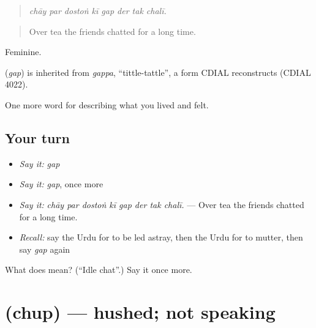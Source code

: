 \begin{quote}
       
\end{quote}

\begin{quote}
\emph{chāy par dostoṅ kī gap der tak chalī.}
\end{quote}

\begin{quote}
Over tea the friends chatted for a long time.
\end{quote}

Feminine.

\begin{cousinweb}
\textbf{} (\emph{gap}) is inherited from \emph{gappa}, \textquotedblleft{}tittle-tattle\textquotedblright{}, a form CDIAL reconstructs (CDIAL 4022).
\end{cousinweb}

\begin{grammarlens}[title={What you've built}]
One more word for describing what you lived and felt.
\end{grammarlens}

\subsection*{Your turn}
\begin{itemize}
\raggedright
  \item \emph{Say it:} \emph{gap}
  \item \emph{Say it:} \emph{gap}, once more
  \item \emph{Say it:} \emph{chāy par dostoṅ kī gap der tak chalī.} — Over tea the friends chatted for a long time.
  \item \emph{Recall:} say the Urdu for to be led astray, then the Urdu for to mutter, then say \emph{gap} again
\end{itemize}

\begin{tcolorbox}[breakable,colback=teal!4,colframe=teal!35!black,title={Before you move on}]
What does  mean? (\textquotedblleft{}Idle chat\textquotedblright{}.) Say it once more.
\end{tcolorbox}
\section[\texorpdfstring{\ur{چپ} (chup)}{چپ (chup)}]{ (chup) — hushed; not speaking}

